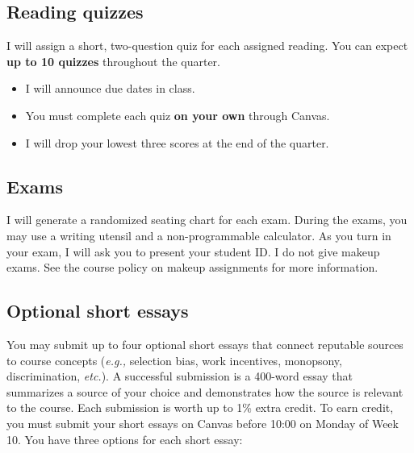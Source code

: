 \documentclass[11pt]{article}
\begin{document}
\newpage

\subsection*{Reading quizzes} 

I will assign a short, two-question quiz for each assigned reading. You can expect \textbf{up to 10 quizzes} throughout the quarter.
\begin{itemize}
	\setlength{\itemsep}{0pt}
	\item I will announce due dates in class. 
	\item You must complete each quiz \textbf{on your own} through Canvas.
	\item I will drop your lowest three scores at the end of the quarter.
\end{itemize}

\subsection*{Exams} 


I will generate a randomized seating chart for each exam. During the exams, you may use a writing utensil and a non-programmable calculator. As you turn in your exam, I will ask you to present your student ID. I do not give makeup exams. See the course policy on makeup assignments for more information.




\subsection*{Optional short essays}

You may submit up to four optional short essays that connect reputable sources to course concepts (\textit{e.g.,} selection bias, work incentives, monopsony, discrimination, \textit{etc.}). A successful submission is a 400-word essay that summarizes a source of your choice and demonstrates how the source is relevant to the course. Each submission is worth up to 1\% extra credit. To earn credit, you must submit your short essays on Canvas before 10:00 on Monday of Week 10. You have three options for each short essay:
\end{document}
